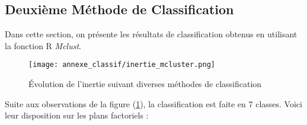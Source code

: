 \documentclass{article}
\begin{document}
\subsection{Deuxième Méthode de Classification} \label{ann:classif2}
Dans cette section, on présente les résultats de classification obtenus en utilisant la fonction R \textit{Mclust}.

\begin{figure}[H]
  \centering
  \texttt{[image: annexe\_classif/inertie\_mcluster.png]} 
  \caption{Évolution de l'inertie suivant diverses méthodes de classification}
  \label{fig:annexe11}
\end{figure}
Suite aux observations de la figure (\ref{fig:annexe11}), la classification est faite en 7 classes. Voici leur disposition sur les plans factoriels :
\end{document}
